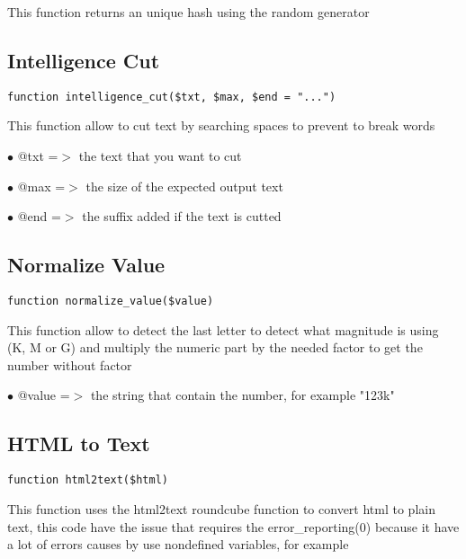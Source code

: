 \documentclass[a4paper]{book}
\begin{document}
This function returns an unique hash using the random generator

\hypertarget{toc271}{}
\subsection{Intelligence Cut}

\begin{lstlisting}
function intelligence_cut($txt, $max, $end = "...")
\end{lstlisting}

This function allow to cut text by searching spaces to prevent to break words

\begin{compactitem}
\item[\color{myblue}$\bullet$] @txt =$>$ the text that you want to cut
\item[\color{myblue}$\bullet$] @max =$>$ the size of the expected output text
\item[\color{myblue}$\bullet$] @end =$>$ the suffix added if the text is cutted
\end{compactitem}

\hypertarget{toc272}{}
\subsection{Normalize Value}

\begin{lstlisting}
function normalize_value($value)
\end{lstlisting}

This function allow to detect the last letter to detect what magnitude is
using (K, M or G) and multiply the numeric part by the needed factor to
get the number without factor

\begin{compactitem}
\item[\color{myblue}$\bullet$] @value =$>$ the string that contain the number, for example "123k"
\end{compactitem}

\hypertarget{toc273}{}
\subsection{HTML to Text}

\begin{lstlisting}
function html2text($html)
\end{lstlisting}

This function uses the html2text roundcube function to convert html to
plain text, this code have the issue that requires the error\_reporting(0)
because it have a lot of errors causes by use nondefined variables, for
example
\end{document}
